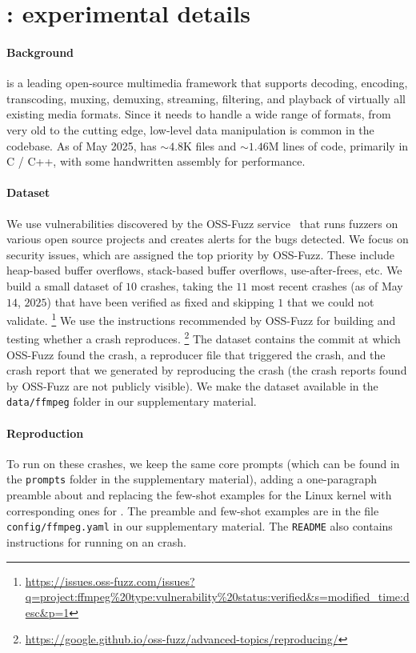 \section{\ffmpeg{}: experimental details}%
\label{app:ffmpeg}

\paragraph{Background} 
\ffmpeg{} is a leading open-source multimedia framework that supports decoding, encoding, transcoding, muxing, demuxing, streaming, filtering, and playback of virtually all existing media formats.
Since it needs to handle a wide range of formats, from very old to the cutting edge, low-level data manipulation is common in the codebase. 
As of May 2025, \ffmpeg{} has $\sim 4.8$K files and $\sim 1.46$M lines of code, primarily in C / C++, with some handwritten assembly for performance.

\paragraph{Dataset}
We use vulnerabilities discovered by the OSS-Fuzz service~\citep{ossfuzz} that runs fuzzers on various open source projects and creates alerts for the bugs detected.
We focus on security issues, which are assigned the top priority by OSS-Fuzz.
These include heap-based buffer overflows, stack-based buffer overflows, use-after-frees, etc.
We build a small dataset of $10$ \ffmpeg{} crashes, taking the $11$ most recent crashes (as of May $14$, $2025$) that have been verified as fixed and skipping $1$ that we could not validate.
\footnote{\url{https://issues.oss-fuzz.com/issues?q=project:ffmpeg\%20type:vulnerability\%20status:verified&s=modified_time:desc&p=1}}
We use the instructions recommended by OSS-Fuzz for building \ffmpeg{} and testing whether a crash reproduces.
\footnote{\url{https://google.github.io/oss-fuzz/advanced-topics/reproducing/}}
The dataset contains the commit at which OSS-Fuzz found the crash, a reproducer file that triggered the crash, and the crash report that we generated by reproducing the crash (the crash reports found by OSS-Fuzz are not publicly visible).
We make the dataset available in the \texttt{data/ffmpeg} folder in our supplementary material.

\paragraph{Reproduction}
To run \cresearcher{} on these crashes, we keep the same core prompts (which can be found in the \texttt{prompts} folder in the supplementary material), adding a one-paragraph preamble about \ffmpeg{} and replacing the few-shot examples for the Linux kernel with corresponding ones for \ffmpeg{}.
The preamble and few-shot examples are in the file \texttt{config/ffmpeg.yaml} in our supplementary material.
The \texttt{README} also contains instructions for running \cresearcher{} on an \ffmpeg{} crash.
